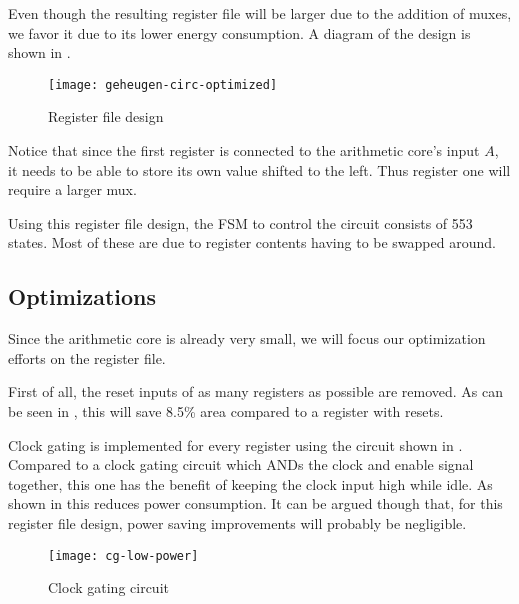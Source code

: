 Even though the resulting register file will be larger due to the addition of muxes, we favor it due to its lower energy consumption. A diagram of the design is shown in .

\begin{figure}[h]
	\centering
		\texttt{[image: geheugen-circ-optimized]}
		\caption{Register file design\label{figure-regs}}
\end{figure}

Notice that since the first register is connected to the arithmetic core's input $A$, it needs to be able to store its own value shifted to the left. Thus register one will require a larger mux.

Using this register file design, the FSM to control the circuit consists of 553 states. Most of these are due to register contents having to be swapped around.

\subsection{Optimizations}

Since the arithmetic core is already very small, we will focus our optimization efforts on the register file.

First of all, the reset inputs of as many registers as possible are removed. As can be seen in , this will save 8.5\% area compared to a register with resets.

Clock gating is implemented for every register using the circuit shown in . Compared to a clock gating circuit which ANDs the clock and enable signal together, this one has the benefit of keeping the clock input high while idle. As shown in \cite{mueller} this reduces power consumption. It can be argued though that, for this register file design, power saving improvements will probably be negligible.

\begin{figure}[h]
	\centering
		\texttt{[image: cg-low-power]}
		\caption{Clock gating circuit\label{figure-cg}}
\end{figure}
